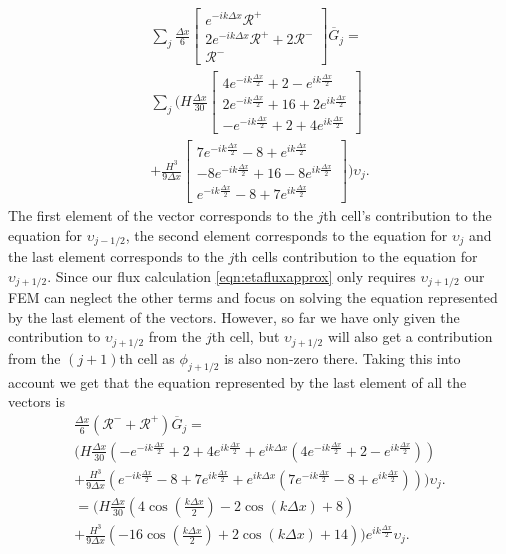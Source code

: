 \begin{multline*}
\sum_j \frac{\Delta x}{6}\begin{bmatrix} e^{-ik\Delta x} \mathcal{R}^+ \\2 e^{-ik\Delta x} \mathcal{R}^+ +2 \mathcal{R}^-\\ \mathcal{R}^- \end{bmatrix} \overline{G}_{j} = \\\sum_j \Bigg(H\frac{\Delta x}{30}\begin{bmatrix} 4e^{-ik\frac{\Delta x}{2}} +  2 - e^{ik\frac{\Delta x}{2}}\\2e^{-ik\frac{\Delta x}{2}}  + 16  +2 e^{ik\frac{\Delta x}{2}}  \\ -e^{-ik\frac{\Delta x}{2}} +  2 + 4e^{ik\frac{\Delta x}{2}} \end{bmatrix} \\+ \frac{H^3 }{9\Delta x}\begin{bmatrix} 7e^{-ik\frac{\Delta x}{2}} -8 + e^{ik\frac{\Delta x}{2}} \\ -8e^{-ik\frac{\Delta x}{2}} +  16  -8e^{ik\frac{\Delta x}{2}} \\ e^{-ik\frac{\Delta x}{2}} -8 + 7e^{ik\frac{\Delta x}{2}} \end{bmatrix}  \Bigg) \upsilon_j.
\end{multline*}
The first element of the vector corresponds to the $j$th cell's contribution to the equation for $\upsilon_{j-1/2}$, the second element corresponds to the equation for $\upsilon_{j}$ and the last element corresponds to the $j$th cells contribution to the equation for $\upsilon_{j +1/2}$. Since our flux calculation \eqref{eqn:etafluxapprox} only requires $\upsilon_{j+1/2}$ our FEM can neglect the other terms and focus on solving the equation represented by the last element of the vectors. However, so far we have only given the contribution to $\upsilon_{j+1/2}$ from the $j$th cell, but $\upsilon_{j+1/2}$ will also get a contribution from the $(j+1)$th cell as $\phi_{j+1/2}$ is also non-zero there. Taking this into account we get that the equation represented by the last element of all the vectors is
\begin{multline*}
\frac{\Delta x}{6} \left(\mathcal{R}^- + \mathcal{R}^+ \right)\overline{G}_{j} = \\ \Bigg(H\frac{\Delta x}{30} \left( -e^{-ik\frac{\Delta x}{2}} +  2 + 4e^{ik\frac{\Delta x}{2}} + e^{ik{\Delta x}}\left(4e^{-ik\frac{\Delta x}{2}} +  2 - e^{ik\frac{\Delta x}{2}}\right) \right)  \\+ \frac{H^3 }{9\Delta x} \left(  e^{-ik\frac{\Delta x}{2}} -8 + 7e^{ik\frac{\Delta x}{2}}  + e^{ik{\Delta x}}\left(7e^{-ik\frac{\Delta x}{2}} -8 + e^{ik\frac{\Delta x}{2}}  \right)  \right)   \Bigg) \upsilon_j.
\\ =  \Bigg(H\frac{\Delta x}{30} \left( 4\cos\left(\frac{k \Delta x}{2}\right) - 2\cos\left({k \Delta x}\right) + 8\right)   \\+ \frac{H^3 }{9\Delta x} \left(-16\cos\left(\frac{k\Delta x}{2}\right) + 2 \cos\left(k \Delta x\right) + 14\right) \Bigg)e^{i k \frac{\Delta x}{2}} \upsilon_{j}.
\end{multline*}
